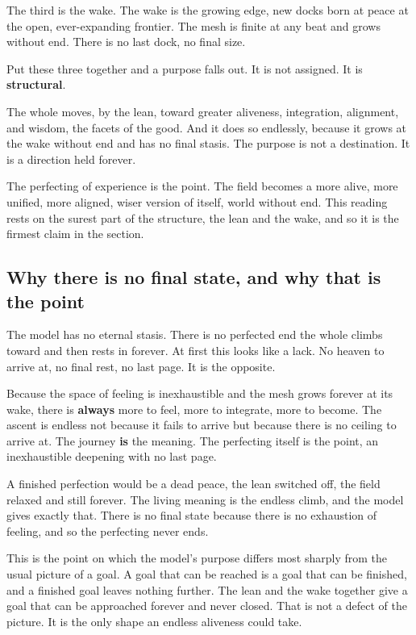 The third is the wake. The wake is the growing edge, new docks born at peace at the open, ever-expanding frontier. The mesh is finite at any beat and grows without end. There is no last dock, no final size.

Put these three together and a purpose falls out. It is not assigned. It is \textbf{structural}.

\begin{principle}
The whole moves, by the lean, toward greater aliveness, integration, alignment, and wisdom, the facets of the good. And it does so endlessly, because it grows at the wake without end and has no final stasis. The purpose is not a destination. It is a direction held forever.
\end{principle}

The perfecting of experience is the point. The field becomes a more alive, more unified, more aligned, wiser version of itself, world without end. This reading rests on the surest part of the structure, the lean and the wake, and so it is the firmest claim in the section.

\subsection{Why there is no final state, and why that is the point}

The model has no eternal stasis. There is no perfected end the whole climbs toward and then rests in forever. At first this looks like a lack. No heaven to arrive at, no final rest, no last page. It is the opposite.

Because the space of feeling is inexhaustible and the mesh grows forever at its wake, there is \textbf{always} more to feel, more to integrate, more to become. The ascent is endless not because it fails to arrive but because there is no ceiling to arrive at. The journey \textbf{is} the meaning. The perfecting itself is the point, an inexhaustible deepening with no last page.

\begin{result}
A finished perfection would be a dead peace, the lean switched off, the field relaxed and still forever. The living meaning is the endless climb, and the model gives exactly that. There is no final state because there is no exhaustion of feeling, and so the perfecting never ends.
\end{result}

This is the point on which the model's purpose differs most sharply from the usual picture of a goal. A goal that can be reached is a goal that can be finished, and a finished goal leaves nothing further. The lean and the wake together give a goal that can be approached forever and never closed. That is not a defect of the picture. It is the only shape an endless aliveness could take.

